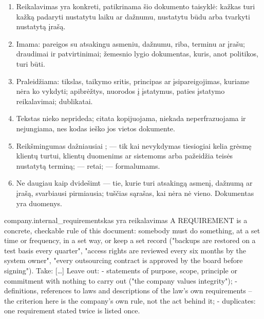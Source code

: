 \begin{enumerate}[itemsep=1pt, topsep=3pt]
  \item Reikalavimas yra konkreti, patikrinama šio dokumento taisyklė: kažkas turi kažką
    padaryti nustatytu laiku ar dažnumu, nustatytu būdu arba tvarkyti nustatytą įrašą.
  \item Imama: pareigos su atsakingu asmeniu, dažnumu, riba, terminu ar įrašu; draudimai ir
    patvirtinimai; žemesnio lygio dokumentas, kuris, anot politikos, turi būti.
  \item Praleidžiama: tikslas, taikymo sritis, principas ar įsipareigojimas, kuriame nėra ko
    vykdyti; apibrėžtys, nuorodos į įstatymus, paties įstatymo reikalavimai; dublikatai.
  \item Tekstas nieko neprideda; citata kopijuojama, niekada neperfrazuojama ir nejungiama, nes
    kodas ieško jos vietos dokumente.
  \item Reikšmingumas dažniausiai ;  --- tik kai nevykdymas tiesiogiai
    kelia grėsmę klientų turtui, klientų duomenims ar sistemoms arba pažeidžia teisės nustatytą
    terminą;  --- retai;  --- formalumams.
  \item Ne daugiau kaip dvidešimt --- tie, kurie turi atsakingą asmenį, dažnumą ar įrašą,
    svarbiausi pirmiausia; tuščias sąrašas, kai nėra nė vieno. Dokumentas yra duomenys.
\end{enumerate}

\par\nopagebreak
\begin{promptexcerpt}{company.internal_requirements}{kas yra reikalavimas}
A REQUIREMENT is a concrete, checkable rule of this document: somebody must do something, at a set time or frequency, in a set way, or keep a set record ("backups are restored on a test basis every quarter", "access rights are reviewed every six months by the system owner", "every outsourcing contract is approved by the board before signing"). Take:
[…]
Leave out:
- statements of purpose, scope, principle or commitment with nothing to carry out ("the company values integrity");
- definitions, references to laws and descriptions of the law's own requirements – the criterion here is the company's own rule, not the act behind it;
- duplicates: one requirement stated twice is listed once.
\end{promptexcerpt}

